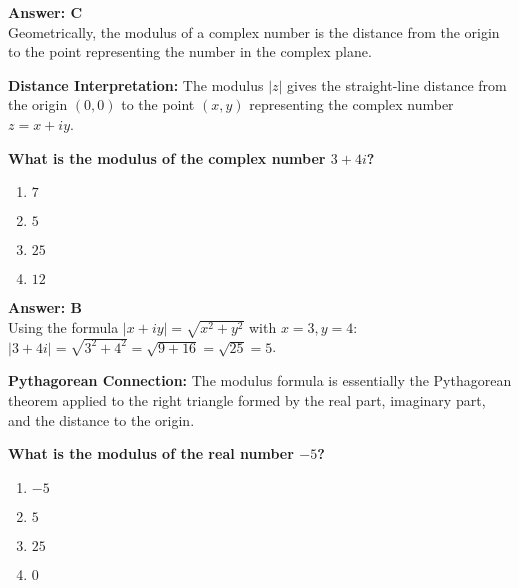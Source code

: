 \documentclass[12pt,a4paper]{article}
\begin{document}
\begin{answerstyle}
\textbf{Answer: C} \\
Geometrically, the modulus of a complex number is the distance from the origin to the point representing the number in the complex plane.
\end{answerstyle}

\begin{conceptbox}
\textbf{Distance Interpretation:} The modulus \( |z| \) gives the straight-line distance from the origin \( (0, 0) \) to the point \( (x, y) \) representing the complex number \( z = x + iy \).
\end{conceptbox}

\newpage
\begin{questiontitle}[MCQ 91]
\textbf{What is the modulus of the complex number \( 3 + 4i \)?}
\end{questiontitle}

\begin{partbox}[Options]
\begin{enumerate}[label=\Alph*.]
    \item \( 7 \)
    \item \( 5 \)
    \item \( 25 \)
    \item \( 12 \)
\end{enumerate}
\end{partbox}

\begin{answerstyle}
\textbf{Answer: B} \\
Using the formula \( |x + iy| = \sqrt{x^2 + y^2} \) with \( x = 3, y = 4 \): \( |3 + 4i| = \sqrt{3^2 + 4^2} = \sqrt{9 + 16} = \sqrt{25} = 5 \).
\end{answerstyle}

\begin{conceptbox}
\textbf{Pythagorean Connection:} The modulus formula is essentially the Pythagorean theorem applied to the right triangle formed by the real part, imaginary part, and the distance to the origin.
\end{conceptbox}

\newpage
\begin{questiontitle}[MCQ 92]
\textbf{What is the modulus of the real number \( -5 \)?}
\end{questiontitle}

\begin{partbox}[Options]
\begin{enumerate}[label=\Alph*.]
    \item \( -5 \)
    \item \( 5 \)
    \item \( 25 \)
    \item \( 0 \)
\end{enumerate}
\end{partbox}
\end{document}
